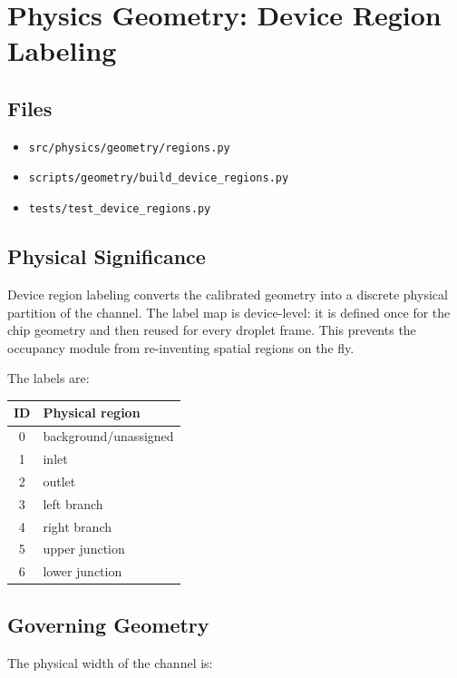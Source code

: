 \section{Physics Geometry: Device Region Labeling}

\subsection{Files}

\begin{itemize}
  \item \texttt{src/physics/geometry/regions.py}
  \item \texttt{scripts/geometry/build\_device\_regions.py}
  \item \texttt{tests/test\_device\_regions.py}
\end{itemize}

\subsection{Physical Significance}

Device region labeling converts the calibrated geometry into a discrete physical
partition of the channel. The label map is device-level: it is defined once for
the chip geometry and then reused for every droplet frame. This prevents the
occupancy module from re-inventing spatial regions on the fly.

The labels are:

\begin{center}
\begin{tabular}{@{}cl@{}}
\toprule
ID & Physical region \\
\midrule
0 & background/unassigned \\
1 & inlet \\
2 & outlet \\
3 & left branch \\
4 & right branch \\
5 & upper junction \\
6 & lower junction \\
\bottomrule
\end{tabular}
\end{center}

\subsection{Governing Geometry}

The physical width of the channel is:

